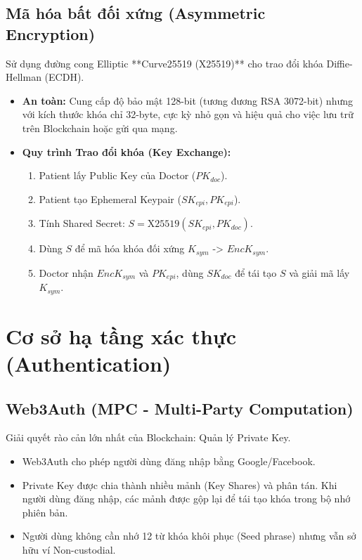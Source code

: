 \documentclass[12pt,a4paper]{report}
\begin{document}
\subsection{Mã hóa bất đối xứng (Asymmetric Encryption)}
Sử dụng đường cong Elliptic **Curve25519 (X25519)** cho trao đổi khóa Diffie-Hellman (ECDH).
\begin{itemize}
    \item \textbf{An toàn:} Cung cấp độ bảo mật 128-bit (tương đương RSA 3072-bit) nhưng với kích thước khóa chỉ 32-byte, cực kỳ nhỏ gọn và hiệu quả cho việc lưu trữ trên Blockchain hoặc gửi qua mạng.
    \item \textbf{Quy trình Trao đổi khóa (Key Exchange):}
    \begin{enumerate}
        \item Patient lấy Public Key của Doctor ($PK_{doc}$).
        \item Patient tạo Ephemeral Keypair ($SK_{epi}, PK_{epi}$).
        \item Tính Shared Secret: $S = \text{X25519}(SK_{epi}, PK_{doc})$.
        \item Dùng $S$ để mã hóa khóa đối xứng $K_{sym}$ -> $EncK_{sym}$.
        \item Doctor nhận $EncK_{sym}$ và $PK_{epi}$, dùng $SK_{doc}$ để tái tạo $S$ và giải mã lấy $K_{sym}$.
    \end{enumerate}
\end{itemize}

\section{Cơ sở hạ tầng xác thực (Authentication)}
\subsection{Web3Auth (MPC - Multi-Party Computation)}
Giải quyết rào cản lớn nhất của Blockchain: Quản lý Private Key.
\begin{itemize}
    \item Web3Auth cho phép người dùng đăng nhập bằng Google/Facebook.
    \item Private Key được chia thành nhiều mảnh (Key Shares) và phân tán. Khi người dùng đăng nhập, các mảnh được gộp lại để tái tạo khóa trong bộ nhớ phiên bản.
    \item Người dùng không cần nhớ 12 từ khóa khôi phục (Seed phrase) nhưng vẫn sở hữu ví Non-custodial.
\end{itemize}
\end{document}

